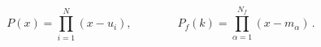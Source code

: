 \begin{equation}
P(x) = \prod _{i=1} ^N (x-u_i),
\qquad \qquad
P_f(k) = \prod _{\alpha =1} ^{N_f}(x-m_\alpha)\, .
\end{equation}

